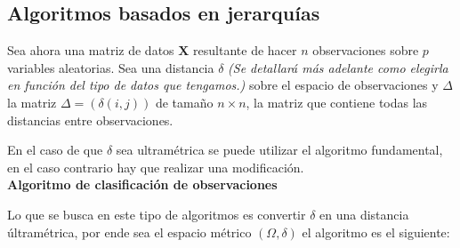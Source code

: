 \newpage
\subsection{Algoritmos basados en jerarquías}
\noindent Sea ahora una matriz de datos $\textbf{X}$ resultante de hacer $n$ observaciones sobre $p$ variables aleatorias. Sea una distancia $\delta$ \textit{(Se detallará más adelante como elegirla en función del tipo de datos que tengamos.)} sobre el espacio de observaciones y $\Delta$ la matriz $\Delta=(\delta(i,j))$ de tamaño $n \times n$, la matriz que contiene todas las distancias entre observaciones. 

\noindent En el caso de que $\delta$ sea ultramétrica se puede utilizar el algoritmo fundamental, en el caso contrario hay que realizar una modificación. \\

\noindent \textbf{Algoritmo de clasificación de observaciones}

\noindent Lo que se busca en este tipo de algoritmos es convertir $\delta$ en una distancia últramétrica, por ende sea el espacio métrico $(\Omega, \delta)$ el algoritmo es el siguiente:\\






















